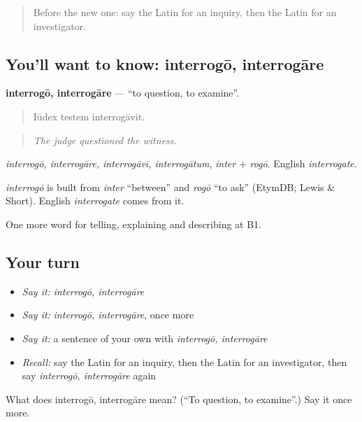 \begin{quote}
Before the new one: say the Latin for an inquiry, then the Latin for an investigator.
\end{quote}

\subsection*{You'll want to know: interrogō, interrogāre}
\textbf{interrogō, interrogāre} — \textquotedblleft{}to question, to examine\textquotedblright{}.

\begin{quote}
Iūdex testem interrogāvit.
\end{quote}

\begin{quote}
\emph{The judge questioned the witness.}
\end{quote}

\emph{interrogō, interrogāre, interrogāvī, interrogātum}, \emph{inter} + \emph{rogō}. English \emph{interrogate}.

\begin{cousinweb}
\emph{interrogō} is built from \emph{inter} \textquotedblleft{}between\textquotedblright{} and \emph{rogō} \textquotedblleft{}to ask\textquotedblright{} (EtymDB; Lewis \& Short). English \emph{interrogate} comes from it.
\end{cousinweb}

\begin{grammarlens}[title={What you've built}]
One more word for telling, explaining and describing at B1.
\end{grammarlens}

\subsection*{Your turn}
\begin{itemize}
\raggedright
  \item \emph{Say it:} \emph{interrogō, interrogāre}
  \item \emph{Say it:} \emph{interrogō, interrogāre}, once more
  \item \emph{Say it:} a sentence of your own with \emph{interrogō, interrogāre}
  \item \emph{Recall:} say the Latin for an inquiry, then the Latin for an investigator, then say \emph{interrogō, interrogāre} again
\end{itemize}

\begin{tcolorbox}[breakable,colback=teal!4,colframe=teal!35!black,title={Before you move on}]
What does interrogō, interrogāre mean? (\textquotedblleft{}To question, to examine\textquotedblright{}.) Say it once more.
\end{tcolorbox}
